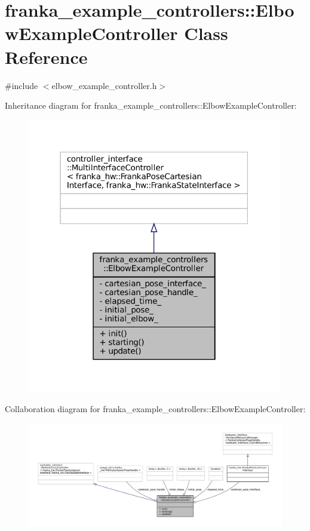 \hypertarget{classfranka__example__controllers_1_1ElbowExampleController}{}\section{franka\+\_\+example\+\_\+controllers\+:\+:Elbow\+Example\+Controller Class Reference}
\label{classfranka__example__controllers_1_1ElbowExampleController}


{\ttfamily \#include $<$elbow\+\_\+example\+\_\+controller.\+h$>$}



Inheritance diagram for franka\+\_\+example\+\_\+controllers\+:\+:Elbow\+Example\+Controller\+:
\nopagebreak
\begin{figure}[H]
\begin{center}
\leavevmode
\includegraphics[width=315pt]{classfranka__example__controllers_1_1ElbowExampleController__inherit__graph}
\end{center}
\end{figure}


Collaboration diagram for franka\+\_\+example\+\_\+controllers\+:\+:Elbow\+Example\+Controller\+:
\nopagebreak
\begin{figure}[H]
\begin{center}
\leavevmode
\includegraphics[width=350pt]{classfranka__example__controllers_1_1ElbowExampleController__coll__graph}
\end{center}
\end{figure}
